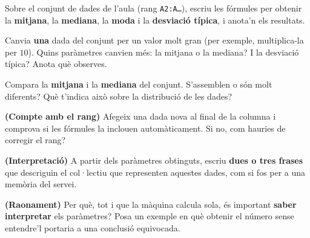 \begin{exercicis}
\begin{exlist}
  \item Sobre el conjunt de dades de l'aula (rang \texttt{A2:A\dots}), escriu les
        fórmules per obtenir la \textbf{mitjana}, la \textbf{mediana}, la \textbf{moda}
        i la \textbf{desviació típica}, i anota'n els resultats.
  \item Canvia \textbf{una} dada del conjunt per un valor molt gran (per exemple,
        multiplica-la per $10$). Quins paràmetres canvien més: la mitjana o la
        mediana? I la desviació típica? Anota què observes.
  \item Compara la \textbf{mitjana} i la \textbf{mediana} del conjunt. S'assemblen o
        són molt diferents? Què t'indica això sobre la distribució de les dades?
  \item \textbf{(Compte amb el rang)} Afegeix una dada nova al final de la columna i
        comprova si les fórmules la inclouen automàticament. Si no, com hauries de
        corregir el rang?
  \item \textbf{(Interpretació)} A partir dels paràmetres obtinguts, escriu \textbf{dues
        o tres frases} que descriguin el col·lectiu que representen aquestes dades, com
        si fos per a una memòria del servei.
  \item \textbf{(Raonament)} Per què, tot i que la màquina calcula sola, és important
        \textbf{saber interpretar} els paràmetres? Posa un exemple en què obtenir el
        número sense entendre'l portaria a una conclusió equivocada.
\end{exlist}
\end{exercicis}

